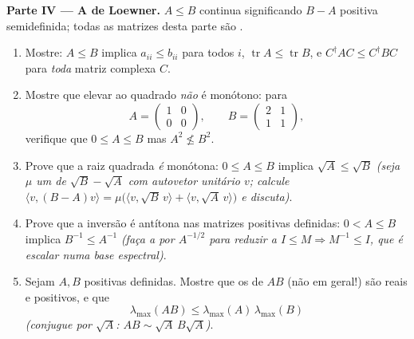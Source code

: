 \begin{problem}
\medskip
\noindent\textbf{Parte IV --- A  de Loewner.} $A \leq B$
continua significando $B - A$ positiva semidefinida; todas as matrizes desta
parte são .
\begin{enumerate}[resume]
  \item Mostre: $A \leq B$ implica $a_{ii} \leq b_{ii}$ para todos
        $i$, $\operatorname{tr} A \leq \operatorname{tr} B$,
        e $C^\dagger AC \leq C^\dagger BC$ para \emph{toda}
        matriz complexa $C$.
  \item Mostre que elevar ao quadrado \emph{não} é monótono: para
        \[
        A = \begin{pmatrix} 1 & 0\\ 0 & 0\end{pmatrix},
        \qquad
        B = \begin{pmatrix} 2 & 1\\ 1 & 1\end{pmatrix},
        \]
        verifique que $0 \leq A \leq B$ mas $A^2 \not\leq B^2$.
  \item Prove que a raiz quadrada \emph{é} monótona: $0 \leq
        A \leq B$ implica $\sqrt A \leq \sqrt B$ \emph{(seja
        $\mu$ um  de $\sqrt B - \sqrt A$ com autovetor
        unitário $v$; calcule $\langle v, (B - A)v\rangle =
        \mu\bigl(\langle v, \sqrt B\,v\rangle + \langle v,
        \sqrt A\,v\rangle\bigr)$ e discuta)}.
  \item Prove que a inversão é antítona nas matrizes positivas
        definidas: $0 < A \leq B$ implica $B^{-1} \leq A^{-1}$
        \emph{(faça a  por $A^{-1/2}$ para reduzir a $I \leq M
        \Rightarrow M^{-1} \leq I$, que é escalar numa
        base espectral)}.
  \item Sejam $A, B$ positivas definidas. Mostre que os
         de $AB$ (não  em geral!) são
        reais e positivos, e que
        \[
        \lambda_{\max}(AB) \leq
        \lambda_{\max}(A)\,\lambda_{\max}(B)
        \]
        \emph{(conjugue por $\sqrt A$: $AB \sim \sqrt
        A\,B\sqrt A$)}.
\end{enumerate}


\end{problem}
